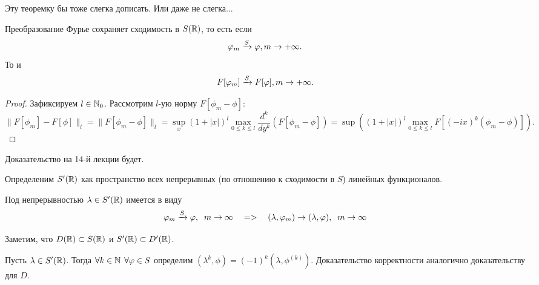 \begin{note}
    Эту теоремку бы тоже слегка дописать.
    Или даже не слегка...
\end{note}
\begin{theorem}
    Преобразование Фурье сохраняет сходимость в $S(\mathbb{R})$, то есть если
    \[
        \varphi_m \xrightarrow{S} \varphi, m \rightarrow +\infty.
    \]
    То и
    \[
        F[\varphi_m] \xrightarrow{S} F[\varphi], m \rightarrow +\infty.
    \]
\end{theorem}
\begin{proof}
    Зафиксируем $l \in \mathbb{N}_0$.
    Рассмотрим $l$-ую норму $F[\phi_m - \phi]$:
    \[
        \|F[\phi_m] - F[\phi]\|_{l} = \|F[\phi_m - \phi]\|_{l} = \sup \limits_x (1 + |x|)^l \max\limits_{0 \leq k \leq l} \dfrac{d^k}{dy^k}(F[\phi_m - \phi]) = \sup ((1 + |x|)^l \max\limits_{0 \leq k \leq l} F[(-ix)^k(\phi_m - \phi)]).
    \]
\end{proof}
\begin{note}
    Доказательство на 14-й лекции будет.
\end{note}
\begin{definition}
    Определеним $S'(\mathbb{R})$ как пространство всех непрерывных (по отношению к сходимости в $S$) линейных функционалов.
\end{definition}
\begin{note}
    Под непрерывностью $\lambda \in S'(\mathbb{R})$ имеется в виду
    \[ \varphi_m \xrightarrow{S} \varphi, \;\; m \rightarrow \infty \quad => \quad (\lambda, \varphi_m) \rightarrow (\lambda, \varphi), \;\; m \rightarrow \infty
    \]
\end{note}
\begin{note}
    Заметим, что $D(\mathbb{R}) \subset S(\mathbb{R})$ и $S'(\mathbb{R}) \subset D'(\mathbb{R})$.
\end{note}
\begin{definition}
    Пусть $\lambda \in S'(\mathbb{R})$.
    Тогда $\forall k \in \mathbb{N} \;\, \forall \varphi \in S$ определим $(\lambda^k, \phi) = (-1)^k (\lambda, \phi^{(k)})$.
    Доказательство корректности аналогично доказательству для $D$.
\end{definition}